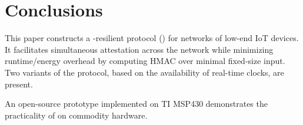 \section{Conclusions \label{conc}}

This paper constructs a \toctou-resilient \sa protocol (\system) 
for networks of low-end IoT devices. It facilitates simultaneous attestation across the network while 
minimizing runtime/energy overhead by computing HMAC over minimal fixed-size input. 
Two variants of the protocol, based on the availability of real-time clocks, are present.

An open-source prototype implemented on TI MSP430 demonstrates the practicality of \system on commodity hardware.
